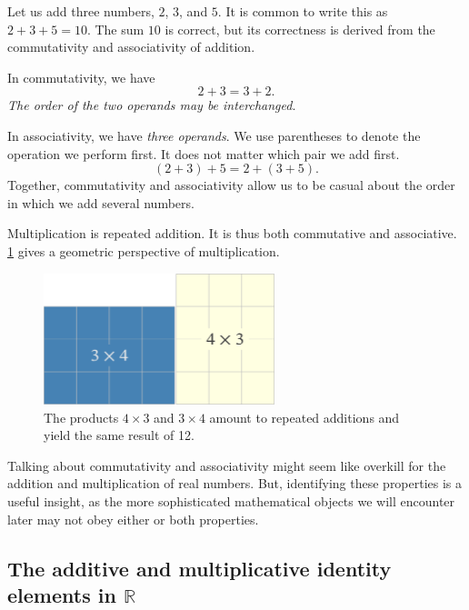 \documentclass[
  a4paper,
]{article}
\begin{document}
Let us add three numbers, \(2\), \(3\), and \(5\). It is common to write
this as \(2 + 3 + 5 = 10\). The sum \(10\) is correct, but its
correctness is derived from the commutativity and associativity of
addition.

In commutativity, we have \[
2 + 3 = 3 + 2.
\] \emph{The order of the two operands may be interchanged}.

In associativity, we have \emph{three operands}. We use parentheses to
denote the operation we perform first. It does not matter which pair we
add first. \[
(2 + 3) + 5 = 2 + (3 + 5).
\] Together, commutativity and associativity allow us to be casual about
the order in which we add several numbers.

Multiplication is repeated addition. It is thus both commutative and
associative. \cref{fig:mult} gives a geometric perspective of
multiplication.

\begin{figure}
\hypertarget{fig:mult}{%
\centering
\includegraphics[width=0.6\textwidth,height=\textheight]{images/four-by-three.png}
\caption{The products \(4\times3\) and \(3\times4\) amount to repeated
additions and yield the same result of 12.}\label{fig:mult}
}
\end{figure}

Talking about commutativity and associativity might seem like overkill
for the addition and multiplication of real numbers. But, identifying
these properties is a useful insight, as the more sophisticated
mathematical objects we will encounter later may not obey either or both
properties.

\hypertarget{the-additive-and-multiplicative-identity-elements-in-mathbbr}{%
\subsection{\texorpdfstring{The additive and multiplicative identity
elements in
\(\mathbb{R}\)}{The additive and multiplicative identity elements in \textbackslash mathbb\{R\}}}\label{the-additive-and-multiplicative-identity-elements-in-mathbbr}}
\end{document}
